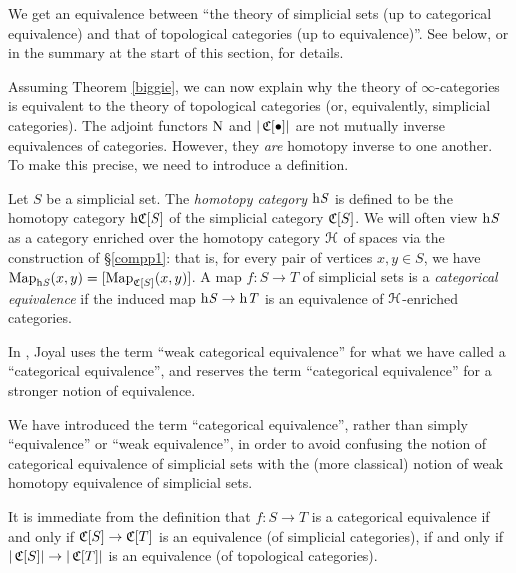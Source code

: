 \begin{1.1.5 inf-cats vs simplicial cats}
\begin{shaded}
We get an equivalence between ``the theory of simplicial sets (up to categorical equivalence)
and that of topological categories (up to equivalence)''. See below, or in the summary at the start of this section, for details.
\end{shaded}

Assuming Theorem \ref{biggie}, we can now explain why the theory of $\infty$-categories is 
equivalent to the theory of topological categories (or, equivalently, simplicial categories).
The adjoint functors $\operatorname{N}$ and $| \operatorname{\mathfrak{C}}[ \bullet ] |$ are not mutually inverse equivalences of categories. However, they {\em are} homotopy inverse to one another. To make this precise, we need to introduce a definition.

\begin{definition}\label{tulkas}
Let $S$ be a simplicial set. The {\it homotopy category} $\rm{h} \it{S}$ is defined to be the homotopy category $\rm{h} \it{ \operatorname{\mathfrak{C}}[S]}$ of the simplicial category $\operatorname{\mathfrak{C}}[S]$.
We will often view $\rm{h} \it{S}$ as a category enriched over the homotopy category
$\operatorname{\mathcal{H}}$ of spaces via the construction of \S \ref{compp1}: that is, for
every pair of vertices $x,y \in S$, we have $\operatorname{{Map}}_{ \rm{h} \it{S}}(x,y) = [ \operatorname{{Map}}_{ \operatorname{\mathfrak{C}}[S]}(x,y) ]$.
A map $f: S \rightarrow T$ of simplicial sets is a {\it categorical equivalence} if 
the induced map $\rm{h} \it{S} \rightarrow \rm{h} \it{T}$ is an equivalence of $\operatorname{\mathcal{H}}$-enriched categories.
\end{definition}

\begin{remark}
In \cite{joyalnotpub}, Joyal uses the term ``weak categorical equivalence'' for what we have called a ``categorical equivalence'', and reserves the term ``categorical equivalence'' for a stronger notion of equivalence.
\end{remark}

\begin{remark}
We have introduced the term ``categorical equivalence'', rather than simply ``equivalence'' or ``weak equivalence'', in order to avoid confusing the notion of categorical equivalence of simplicial sets with the (more classical) notion of weak homotopy equivalence of simplicial sets.
\end{remark}

\begin{remark}\label{gytyt}
It is immediate from the definition that $f: S \rightarrow T$ is a categorical equivalence if and only if
$\operatorname{\mathfrak{C}}[S] \rightarrow \operatorname{\mathfrak{C}}[T]$ is an equivalence (of simplicial categories), if and only if $|\operatorname{\mathfrak{C}}[S]| \rightarrow |\operatorname{\mathfrak{C}}[T]|$ is an equivalence (of topological categories).
\end{remark}


\end{1.1.5 inf-cats vs simplicial cats}
